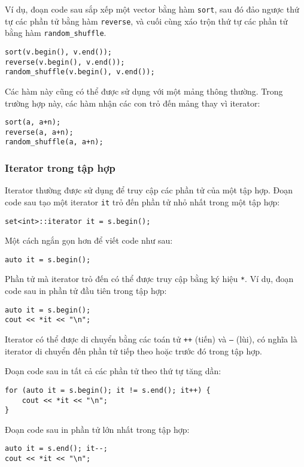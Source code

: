 Ví dụ, đoạn code sau sắp xếp một vector
bằng hàm \texttt{sort},
sau đó đảo ngược thứ tự các phần tử bằng hàm
\texttt{reverse}, và cuối cùng xáo trộn thứ tự
các phần tử bằng hàm \texttt{random\_shuffle}.


\begin{lstlisting}
sort(v.begin(), v.end());
reverse(v.begin(), v.end());
random_shuffle(v.begin(), v.end());
\end{lstlisting}

Các hàm này cũng có thể được sử dụng với một mảng thông thường.
Trong trường hợp này, các hàm nhận các con trỏ đến mảng
thay vì iterator:

\begin{lstlisting}
sort(a, a+n);
reverse(a, a+n);
random_shuffle(a, a+n);
\end{lstlisting}

\subsubsection{Iterator trong tập hợp}

Iterator thường được sử dụng để truy cập
các phần tử của một tập hợp.
Đoạn code sau tạo một iterator
\texttt{it} trỏ đến phần tử nhỏ nhất trong một tập hợp:
\begin{lstlisting}
set<int>::iterator it = s.begin();
\end{lstlisting}
Một cách ngắn gọn hơn để viết code như sau:
\begin{lstlisting}
auto it = s.begin();
\end{lstlisting}
Phần tử mà iterator trỏ đến
có thể được truy cập bằng ký hiệu \texttt{*}.
Ví dụ, đoạn code sau in
phần tử đầu tiên trong tập hợp:

\begin{lstlisting}
auto it = s.begin();
cout << *it << "\n";
\end{lstlisting}

Iterator có thể được di chuyển bằng các toán tử
\texttt{++} (tiến) và \texttt{--} (lùi),
có nghĩa là iterator di chuyển đến phần tử
tiếp theo hoặc trước đó trong tập hợp.

Đoạn code sau in tất cả các phần tử
theo thứ tự tăng dần:
\begin{lstlisting}
for (auto it = s.begin(); it != s.end(); it++) {
    cout << *it << "\n";
}
\end{lstlisting}
Đoạn code sau in phần tử lớn nhất trong tập hợp:
\begin{lstlisting}
auto it = s.end(); it--;
cout << *it << "\n";
\end{lstlisting}

